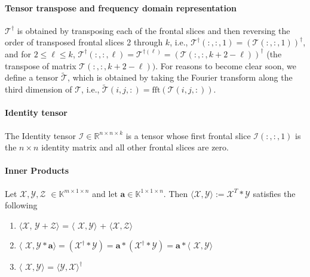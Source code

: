 \documentclass[format=acmsmall, review=false, screen=true]{acmart}
\begin{document}
\paragraph{Tensor transpose and frequency domain representation}
$\mathcal{T}^{\dagger}$ is obtained by transposing each of the frontal slices and then reversing the order of transposed frontal slices 2 through
$k$, i.e., $\mathcal{T}^{\dagger}(:,:,1) = (\mathcal{T}(:,:,1))^{\dagger}$, and for $2 \leq \ell \leq k$,
$\mathcal{T}^{\dagger}(:, :, \ell) = \mathcal{T}^{\dagger(\ell)} = (\mathcal{T}(:, :, k +2 -\ell))^{\dagger}$ (the transpose of
matrix $\mathcal{T}(:, :, k + 2 - \ell))$. For reasons to become clear soon, we define a tensor $\widetilde{\mathcal{T}}$,
which is obtained by taking the Fourier transform along the third dimension of $\mathcal{T}$, i.e., $\widetilde{\mathcal{T}}(i, j, :) = \mathrm{fft}(\mathcal{T}(i, j, :))$.

\paragraph{Identity tensor} The Identity tensor $\mathcal{I} \in
\mathbb{R}^{n\times n \times k} $ is a tensor whose first frontal
slice $\mathcal{I}(:, :, 1)$ is the $n \times n $ identity matrix and
all other frontal slices are zero.

\paragraph{Inner Products} Let $\mathcal{X}, \mathcal{Y}, \mathcal{Z}$ $\in
\mathbb{K}^{m \times 1 \times n}$ and let $\mathbf{a} \in \mathbb{K}^{1 \times 1
\times n}$. Then $\langle \mathcal{X}, \mathcal{Y} \rangle := \mathcal{X}^T \ast \mathcal{Y}$ satisfies the following
\begin{enumerate}
    \item $\langle \mathcal{X}$, $\mathcal{Y} + \mathcal{Z} \rangle$ = $\langle$ $ \mathcal{X}, \mathcal{Y} \rangle$ + $\langle \mathcal{X},\mathcal{Z} \rangle$
    \item $\langle$ $\mathcal{X},\mathcal{Y} \ast \mathbf{a} \rangle =
        (\mathcal{X}^{\dagger} \ast \mathcal{Y}) = \mathbf{a} \ast
        (\mathcal{X}^{\dagger} \ast \mathcal{Y}) = \mathbf{a} \ast \langle$ $\mathcal{X},\mathcal{Y} \rangle$
    \item $\langle$ $\mathcal{X},\mathcal{Y} \rangle$ = $\langle
        \mathcal{Y},\mathcal{X} \rangle^{\dagger}$
\end{enumerate}
\end{document}
